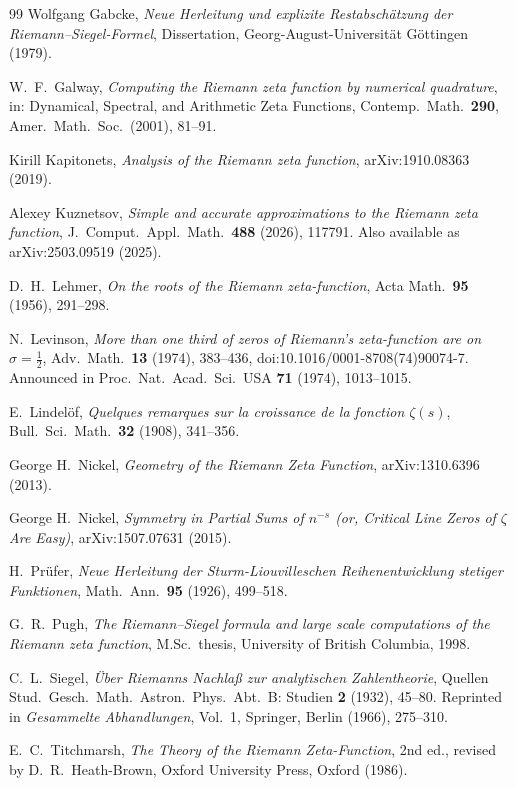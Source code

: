 \documentclass[11pt]{article}
\theoremstyle{definition}
\begin{document}
\begin{thebibliography}{99}
Wolfgang Gabcke, \emph{Neue Herleitung und explizite Restabsch\"atzung der
Riemann--Siegel-Formel}, Dissertation, Georg-August-Universit\"at
G\"ottingen (1979).

W.~F.\ Galway, \emph{Computing the Riemann zeta function by numerical
quadrature}, in: Dynamical, Spectral, and Arithmetic Zeta Functions,
Contemp.\ Math.\ \textbf{290}, Amer.\ Math.\ Soc.\ (2001), 81--91.

Kirill Kapitonets, \emph{Analysis of the Riemann zeta function},
arXiv:1910.08363 (2019).

Alexey Kuznetsov, \emph{Simple and accurate approximations to the Riemann
zeta function}, J.\ Comput.\ Appl.\ Math.\ \textbf{488} (2026), 117791.
Also available as arXiv:2503.09519 (2025).

D.~H.\ Lehmer, \emph{On the roots of the Riemann zeta-function},
Acta Math.\ \textbf{95} (1956), 291--298.

N.~Levinson, \emph{More than one third of zeros of Riemann's zeta-function
are on $\sigma=\tfrac12$}, Adv.\ Math.\ \textbf{13} (1974), 383--436,
doi:10.1016/0001-8708(74)90074-7. Announced in Proc.\ Nat.\ Acad.\ Sci.\ USA
\textbf{71} (1974), 1013--1015.

E.~Lindel\"of, \emph{Quelques remarques sur la croissance de la fonction
$\zeta(s)$}, Bull.\ Sci.\ Math.\ \textbf{32} (1908), 341--356.

George H.\ Nickel, \emph{Geometry of the Riemann Zeta Function},
arXiv:1310.6396 (2013).

George H.\ Nickel, \emph{Symmetry in Partial Sums of $n^{-s}$ (or, Critical Line
Zeros of $\zeta$ Are Easy)}, arXiv:1507.07631 (2015).

H.~Pr\"ufer, \emph{Neue Herleitung der Sturm-Liouvilleschen
Reihenentwicklung stetiger Funktionen}, Math.\ Ann.\ \textbf{95} (1926),
499--518.

G.~R.\ Pugh, \emph{The Riemann--Siegel formula and large scale computations
of the Riemann zeta function}, M.Sc.\ thesis, University of British
Columbia, 1998.

C.~L.\ Siegel, \emph{\"Uber Riemanns Nachla\ss{} zur analytischen
Zahlentheorie}, Quellen Stud.\ Gesch.\ Math.\ Astron.\ Phys.\ Abt.\ B:
Studien \textbf{2} (1932), 45--80. Reprinted in \emph{Gesammelte
Abhandlungen}, Vol.~1, Springer, Berlin (1966), 275--310.

E.~C.\ Titchmarsh, \emph{The Theory of the Riemann Zeta-Function},
2nd ed., revised by D.~R.\ Heath-Brown, Oxford University Press,
Oxford (1986).

\end{thebibliography}
\end{document}

